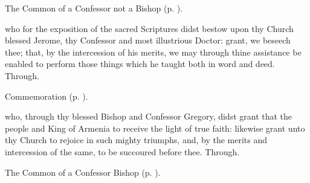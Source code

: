 
\begin{rubric}
	The Common of a Confessor not a Bishop (p. \pageref{CommonConfessorNotBishop}).
\end{rubric}

\collect
{} who for the exposition of the sacred Scriptures didst bestow upon thy Church blessed Jerome, thy Confessor and most illustrious Doctor: grant, we beseech thee; that, by the intercession of his merits, we may through thine assistance be enabled to perform those things which he taught both in word and deed. Through.

\begin{rubric}
    Commemoration  (p. \pageref{ArmeniaCollect}).
\end{rubric}


\clearpage
{}

\memorialCollect\label{ArmeniaCollect}
 who, through thy blessed Bishop and Confessor Gregory, didst grant that the people and King of Armenia to receive the light of true faith: likewise grant unto thy Church to rejoice in such mighty triumphs, and, by the merits and intercession of the same, to be succoured before thee. Through.



\begin{rubric}
	The Common of a Confessor Bishop (p. \pageref{ConfessorBishopCollect}).
\end{rubric}



